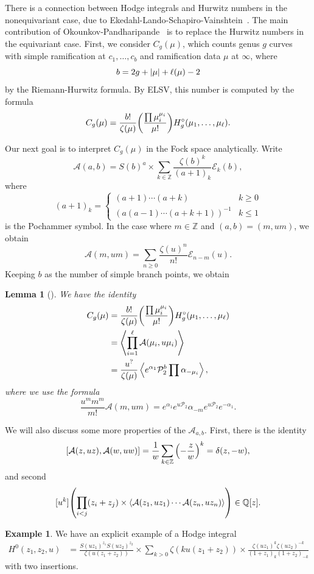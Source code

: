 \documentclass[leqno, openany]{memoir}
\newtheorem{lem}[thm]{Lemma}
\theoremstyle{definition}
\newtheorem{exm}[thm]{Example}
\theoremstyle{remark}
\theoremstyle{plain}
\theoremstyle{definition}
\theoremstyle{remark}
\newcommand{\Z}{\mathbb{Z}}
\newcommand{\Q}{\mathbb{Q}}
\newcommand{\mc}[1]{\mathcal{#1}}
\begin{document}
There is a connection between Hodge integrals and Hurwitz numbers in the nonequivariant case, due to Ekedahl-Lando-Schapiro-Vainshtein~\cite{elsv}. The main contribution of Okounkov-Pandharipande~\cite{op2} is to replace the Hurwitz numbers in the equivariant case. First, we consider $C_g(\mu)$, which counts genus $g$ curves with simple ramification at $c_1, \ldots, c_b$ and ramification data $\mu$ at $\infty$, where
\[ b = 2g + \abs{\mu} + \ell(\mu) - 2 \]
by the Riemann-Hurwitz formula. By ELSV, this number is computed by the formula
\[ C_g(\mu) = \frac{b!}{\zeta(\mu)} \qty(\frac{\prod \mu_i^{\mu_i}}{\mu!}) H_g^{\circ}(\mu_1, \ldots, \mu_{\ell}). \]

Our next goal is to interpret $C_g(\mu)$ in the Fock space analytically. Write
\[ \mc{A}(a,b) = S(b)^a \times \sum_{k \in \Z} \frac{\zeta(b)^k}{(a+1)_k} \mc{E}_k(b), \]
where
\[ (a+1)_k = \begin{cases}
    (a+1) \cdots (a+k) & k \geq 0 \\
    (a(a-1)\cdots(a+k+1))^{-1} & k \leq 1
\end{cases}
\]
is the Pochammer symbol. In the case where $m \in \Z$ and $(a,b) = (m, um)$, we obtain
\[ \mc{A}(m, um) = \sum_{n \geq 0} \frac{\zeta(u)^n}{n!} \mc{E}_{n-m}(u). \]
Keeping $b$ as the number of simple branch points, we obtain

\begin{lem}[\cite{op2}]
    We have the identity
    \begin{align*}
        C_g(\mu) &= \frac{b!}{\zeta(\mu)} \qty(\frac{\prod \mu_i^{\mu_i}}{\mu!}) H_g^{\circ}(\mu_1, \ldots, \mu_{\ell}) \\
        &= \ev{\prod_{i=1}^{\ell} \mc{A}(\mu_i, u \mu_i)} \\
        &= \frac{u^?}{\zeta(\mu)} \ev{e^{\alpha_1} \mc{P}_2^b \prod \alpha_{-\mu_i}},
    \end{align*}
    where we use the formula
    \[ \frac{u^m m^m}{m!} \mc{A}(m, um) = e^{\alpha_1} e^{u \mc{P}_2} \alpha_{-m} e^{u \mc{P}_2} e^{-\alpha_1}. \]
\end{lem}

We will also discuss some more properties of the $\mc{A}_{a,b}$. First, there is the identity
\[ [\mc{A}(z, uz), \mc{A}(w, uw)] = \frac{1}{w} \sum_{k \in \Z} \qty(-\frac{z}{w})^k = \delta(z, -w), \]
and second
\[ [u^k] \qty(\prod_{i < j} (z_i + z_j) \times \ev{\mc{A}(z_1, uz_1) \cdots \mc{A}(z_n, uz_n)}) \in \Q[z]. \]

\begin{exm}
    We have an explicit example of a Hodge integral
    \begin{align*}
        H^0(z_1, z_2, u) &= \frac{S(uz_1)^{z_1} S(uz_2)^{z_2}}{\zeta(u(z_1+z_2))} \times \sum_{k > 0} \zeta(ku(z_1+z_2)) \times \frac{\zeta(uz_1)^k \zeta(uz_2)^{-k}}{(1+z_1)_k (1+z_2)_{-k}}
    \end{align*}
    with two insertions.
\end{exm}
\end{document}
